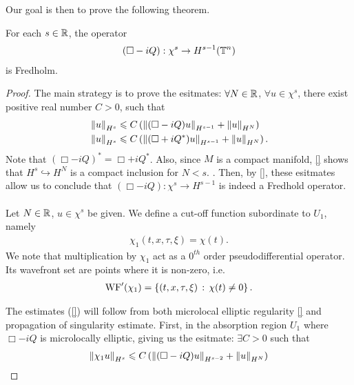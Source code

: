 \documentclass[12pt]{article}
\begin{document}
Our goal is then to prove the following theorem. 
\begin{ftheorem}
    For each $s \in \R$, the operator
    \begin{align*}
    (\Box - iQ): \chi^s \to H^{s - 1}(\T^n)
    \end{align*}
    is Fredholm. 
\end{ftheorem}
\begin{proof}
    The main strategy is to prove the esitmates: $\forall N \in \R$, $\forall u \in \chi^s$, there exist positive real number $C > 0$, such that
    \begin{align} \label{eq : fredholm estimate for wave operator} 
    &\norm[u]_{H^s} \leq C \brac{ \norm[(\Box - i Q)u]_{H^{s - 1}} + \norm[u]_{H^N}} \\
    &\norm[u]_{H^s} \leq C \brac{ \norm[(\Box + i Q^*)u]_{H^{s - 1}} + \norm[u]_{H^N}}. 
    \end{align}
    Note that $(\Box - iQ)^* = \Box + i Q^*$. Also, since $M$ is a compact manifold, \ref{} shows that $H^{s} \hookrightarrow H^{N}$ is a compact inclusion for $N < s$. . Then, by \ref{}, these esitmates allow us to conclude that $(\Box - iQ) : \chi^s \to H^{s - 1}$ is indeed a Fredhold operator.     \\
    \\
    Let $N \in \R$, $u \in \chi^s$ be given. We define a cut-off function subordinate to $U_1$, namely
    \begin{align*}
    \chi_1(t, x, \tau, \xi) = \chi(t). 
    \end{align*}
    We note that multiplication by $\chi_1$ act as a $0^{th}$ order pseudodifferential operator. Its wavefront set are points where it is non-zero, i.e. 
    \begin{align*}
    \WF'(\chi_1) = \set{(t, x, \tau, \xi) \wh \chi(t) \neq 0 }. 
    \end{align*} 
    
    The estimates (\ref{}) will follow from both microlocal elliptic regularity  \ref{} and propagation of singularity estimate. First, in the absorption region $U_1$ where $\Box - iQ$ is microlocally elliptic, giving us the esitmate: $\exists C > 0$ such that
    \begin{align*}
    \norm[\chi_1 u]_{H^s} \leq C \brac{\norm[(\Box - iQ)u ]_{H^{s - 2}} + \norm[u]_{H^N}}
    \end{align*}
    

\end{proof}
\end{document}
